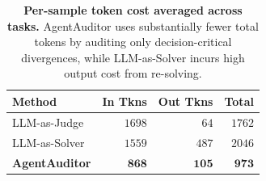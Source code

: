 \documentclass{article}
\theoremstyle{plain}
\theoremstyle{definition}
\theoremstyle{remark}
\begin{document}


\begin{table}[t]
\centering
\small
\setlength{\tabcolsep}{4pt}
\renewcommand{\arraystretch}{1.0}
\caption{\textbf{Per-sample token cost averaged across tasks.} AgentAuditor uses substantially fewer total tokens by auditing only decision-critical divergences, while LLM-as-Solver incurs high output cost from re-solving.}
\label{tab:token_usage}
\begin{tabular}{l r r r}
\textbf{Method} & \textbf{In Tkns} & \textbf{Out Tkns} & \textbf{Total} \\
\toprule
LLM-as-Judge  & $1698$ & $64$  & $1762$ \\
LLM-as-Solver & $1559$ & $487$ & $2046$ \\
\cellcolor{graybg}\textbf{AgentAuditor} & \cellcolor{graybg}$\pmb{868}$ & \cellcolor{graybg}$\pmb{105}$ & \cellcolor{graybg}$\pmb{973}$ \\
\bottomrule
\end{tabular}
\end{table}
\end{document}
